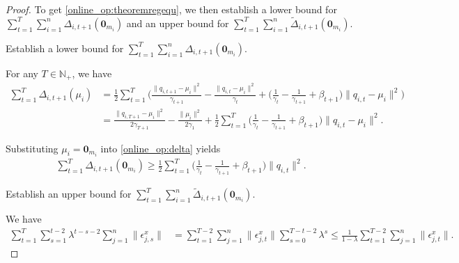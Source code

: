 \documentclass[12pt,draftcls,onecolumn]{IEEEtran}%
\begin{document}
\begin{proof}
To get \eqref{online_op:theoremregequ}, we then establish a lower bound for $\sum_{t=1}^T\sum_{i=1}^n
\Delta_{i,t+1}(\bm{0}_{m_i})$ and an upper bound for $\sum_{t=1}^{T}\sum_{i=1}^n\tilde{\Delta}_{i,t+1}(\bm{0}_{m_i})$.

 Establish a lower bound for $\sum_{t=1}^T\sum_{i=1}^n
\Delta_{i,t+1}(\bm{0}_{m_i})$.

For any $T\in\mathbb{N}_+$, we have
\begin{align}\label{online_op:delta}
\sum_{t=1}^T\Delta_{i,t+1}(\mu_i)
&=\frac{1}{2}\sum_{t=1}^T\Big(\frac{\|q_{i,t+1}-\mu_i\|^2}{\gamma_{t+1}}
-\frac{\|q_{i,t}-\mu_i\|^2}{\gamma_{t}}
+\Big(\frac{1}{\gamma_{t}}-\frac{1}{\gamma_{t+1}}+\beta_{t+1}\Big)
\|q_{i,t}-\mu_i\|^2\Big)\nonumber\\
&=\frac{\|q_{i,T+1}-\mu_i\|^2}{2\gamma_{T+1}}-\frac{\|\mu_i\|^2}{2\gamma_1}
+\frac{1}{2}\sum_{t=1}^T\Big(\frac{1}{\gamma_{t}}-\frac{1}{\gamma_{t+1}}+\beta_{t+1}\Big)
\|q_{i,t}-\mu_i\|^2.
\end{align}

Substituting $\mu_i=\bm{0}_{m_i}$ into \eqref{online_op:delta} yields
\begin{align}\label{online_op:delta_zero}
\sum_{t=1}^T\Delta_{i,t+1}(\bm{0}_{m_i})
\ge\frac{1}{2}\sum_{t=1}^T\Big(\frac{1}{\gamma_{t}}-\frac{1}{\gamma_{t+1}}+\beta_{t+1}\Big)
\|q_{i,t}\|^2.
\end{align}

 Establish an upper bound for $\sum_{t=1}^{T}\sum_{i=1}^n\tilde{\Delta}_{i,t+1}(\bm{0}_{m_i})$.

We have
\begin{align}
\sum_{t=1}^{T}\sum_{s=1}^{t-2}\lambda^{t-s-2}\sum_{j=1}^n\|\epsilon^x_{j,s}\|
&=\sum_{t=1}^{T-2}\sum_{j=1}^n\|\epsilon^x_{j,t}\|\sum_{s=0}^{T-t-2}\lambda^s
\le\frac{1}{1-\lambda}\sum_{t=1}^{T-2}\sum_{j=1}^n\|\epsilon^x_{j,t}\|.
\label{online_op:xitxbarT1}
\end{align}


\end{proof}
\end{document}
